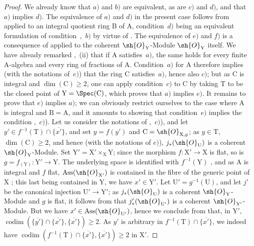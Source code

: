 \begin{proof}
We already know  that $a)$ and $b)$ are equivalent, as are $c)$ and $d)$, and that $a)$ implies $d)$.
The equivalence of $a)$ and $d)$ in the present case follows from  applied to an integral quotient ring $\mathrm{B}$ of $\mathrm{A}$, condition~$d)$ being an equivalent formulation of condition~,~$b)$ by virtue of .
The equivalence of $e)$ and $f)$ is a consequence of  applied to the coherent $\sh{O}_\mathrm{Y}$-Module $\sh{O}_\mathrm{Y}$ itself.
We have already remarked ,~(ii) that if $\mathrm{A}$ satisfies~$a)$, the same holds for every finite A-algebra and every ring of fractions of $\mathrm{A}$.
Condition~$a)$ for $\mathrm{A}$ therefore implies (with the notations of~$e)$) that the ring $\mathrm{C}$ satisfies~$a)$, hence also $c)$; but as $\mathrm{C}$ is integral and $\dim(\mathrm{C})\geqslant 2$, one can apply condition~$c)$ to $\mathrm{C}$ by taking $\mathrm{T}$ to be the closed point of $\mathrm{Y}=\Spec(\mathrm{C})$, which proves that $a)$ implies $e)$.
It remains to prove that $e)$ implies $a)$;
we can obviously restrict ourselves to the case where $\mathrm{A}$ is integral and $\mathrm{B}=\mathrm{A}$, and it amounts to showing that condition~$e)$ implies the condition ,~$c)$).
Let us consider the notations of ,~$c)$), and let $y'\in f^{-1}(\mathrm{T})\cap\overline{\{x'\}}$, and set $y=f(y')$ and $\mathrm{C}=\sh{O}_{\mathrm{X},y}$; as $y\in\mathrm{T}$, $\dim(\mathrm{C})\geqslant 2$, and hence (with the notations of $e)$), $j_*(\sh{O}_\mathrm{U})$ is a coherent $\sh{O}_\mathrm{Y}$-Module.
Set $\mathrm{Y}'=\mathrm{X}'\times_\mathrm{X}\mathrm{Y}$; since the morphism $f:\mathrm{X}'\to\mathrm{X}$ is flat, so is $g=f_{(\mathrm{Y})}:\mathrm{Y}'\to\mathrm{Y}$.
The underlying space is identified with $f^{-1}(\mathrm{Y})$ , and as $\mathrm{A}$ is integral and $f$ flat, $\operatorname{Ass}(\sh{O}_{\mathrm{X}'})$ is contained in the fibre of the generic point of $\mathrm{X}$ ; this last being contained in $\mathrm{Y}$, we have $x'\in\mathrm{Y}'$.
Let $\mathrm{U}'=g^{-1}(\mathrm{U})$, and let $j'$ be the canonical injection $\mathrm{U}'\to\mathrm{Y}'$; as $j_*(\sh{O}_\mathrm{U})$ is a coherent $\sh{O}_\mathrm{Y}$-Module and $g$ is flat, it follows from  that $j'_*(\sh{O}_{\mathrm{U}'})$ is a coherent $\sh{O}_{\mathrm{Y}'}$-Module.
But we have $x'\in\operatorname{Ass}(\sh{O}_{\mathrm{U}'})$, hence we conclude from  that, in $\mathrm{Y}'$,
$\operatorname{codim}(\overline{\{y'\}}\cap\overline{\{x'\}},\overline{\{x'\}})\geqslant 2$.
As $y'$ is arbitrary in $f^{-1}(\mathrm{T})\cap\overline{\{x'\}}$, we indeed have
$\operatorname{codim}(f^{-1}(\mathrm{T})\cap\overline{\{x'\}},\overline{\{x'\}})\geqslant 2$ in $\mathrm{X}'$.
\end{proof}

